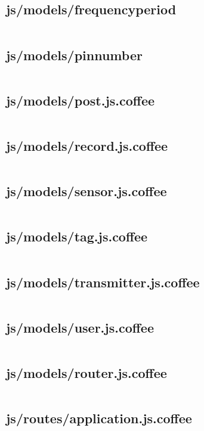 \documentclass[letterpaper, 12 pt]{article}
\begin{document}
\subsection{js/models/frequency\textunderscore period}
\inputminted{ruby}{../app/assets/javascripts/models/frequency_period.js.coffee}
\subsection{js/models/pin\textunderscore number}
\inputminted{ruby}{../app/assets/javascripts/models/pin_number.js.coffee}
\subsection{js/models/post.js.coffee}
\inputminted{ruby}{../app/assets/javascripts/models/post.js.coffee}
\subsection{js/models/record.js.coffee}
\inputminted{ruby}{../app/assets/javascripts/models/record.js.coffee}
\subsection{js/models/sensor.js.coffee}
\inputminted{ruby}{../app/assets/javascripts/models/sensor.js.coffee}
\subsection{js/models/tag.js.coffee}
\inputminted{ruby}{../app/assets/javascripts/models/tag.js.coffee}
\subsection{js/models/transmitter.js.coffee}
\inputminted{ruby}{../app/assets/javascripts/models/transmitter.js.coffee}
\subsection{js/models/user.js.coffee}
\inputminted{ruby}{../app/assets/javascripts/models/user.js.coffee}

\subsection{js/models/router.js.coffee}
\inputminted{ruby}{../app/assets/javascripts/router.js.coffee}

\subsection{js/routes/application.js.coffee}
\inputminted{ruby}{../app/assets/javascripts/routes/application.js.coffee}
\end{document}
